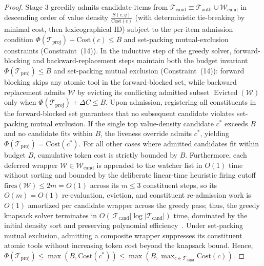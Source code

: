 \documentclass[conference,10pt]{IEEEtran}
\begin{document}
\begin{proof}
Stage 3 greedily admits candidate items from $\mathcal{T}_{\text{cand}} \equiv \mathcal{T}_{\text{auth}} \cup \mathcal{W}_{\text{cand}}$ in descending order of value density $\frac{S(c, q)}{\text{Cost}(c)}$ (with deterministic tie-breaking by minimal cost, then lexicographical ID) subject to the per-item admission condition $\Phi(\mathcal{T}_{\text{proj}}) + \text{Cost}(c) \le B$ and set-packing mutual-exclusion constraints (Constraint~(14)). In the inductive step of the greedy solver, forward-blocking and backward-replacement steps maintain both the budget invariant $\Phi(\mathcal{T}_{\text{proj}}) \le B$ and set-packing mutual exclusion (Constraint~(14)): forward blocking skips any atomic tool in the forward-blocked set, while backward replacement admits $\mathcal{W}$ by evicting its conflicting admitted subset $\operatorname{Evicted}(\mathcal{W})$ only when $\Phi(\mathcal{T}_{\text{proj}}) + \Delta C \le B$. Upon admission, registering all constituents in the forward-blocked set guarantees that no subsequent candidate violates set-packing mutual exclusion. If the single top value-density candidate $c^*$ exceeds $B$ and no candidate fits within $B$, the liveness override admits $c^*$, yielding $\Phi(\mathcal{T}_{\text{proj}}) = \text{Cost}(c^*)$. For all other cases where admitted candidates fit within budget $B$, cumulative token cost is strictly bounded by $B$. Furthermore, each deferred wrapper $\mathcal{W} \in \mathcal{W}_{\text{cand}}$ is appended to the watcher list in $O(1)$ time without sorting and bounded by the deliberate linear-time heuristic firing cutoff $\text{fires}(\mathcal{W}) \le 2m = O(1)$ across its $m \le 3$ constituent steps, so its $O(m) = O(1)$ re-evaluation, eviction, and constituent re-admission work is $O(1)$ amortized per candidate wrapper across the greedy pass; thus, the greedy knapsack solver terminates in $O(|\mathcal{T}_{\text{cand}}| \log |\mathcal{T}_{\text{cand}}|)$ time, dominated by the initial density sort and preserving polynomial efficiency~\cite{karp1972reducibility}. Under set-packing mutual exclusion, admitting a composite wrapper suppresses its constituent atomic tools without increasing token cost beyond the knapsack bound. Hence, $\Phi(\mathcal{T}_{\text{proj}}) \le \max\left(B, \text{Cost}(c^*)\right) \le \max\left(B, \max_{c \in \mathcal{T}_{\text{cand}}} \text{Cost}(c)\right)$.
\end{proof}
\end{document}
